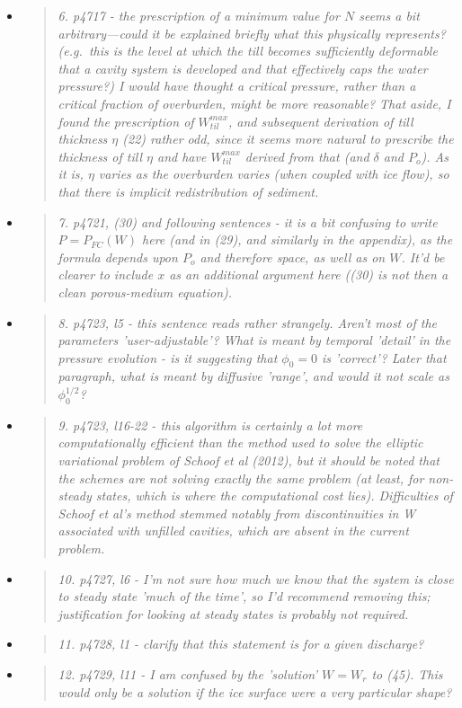 \documentclass[11pt,reqno]{amsart}
\newcommand{\reply}[2]{
\medskip\medskip
\item  \begin{quote}
\emph{#1}
\end{quote}

\medskip
\noindent #2}
\begin{document}
\begin{itemize}
\reply{6. p4717 - the prescription of a minimum value for $N$ seems a bit arbitrary---could
it be explained briefly what this physically represents? (e.g.~this is the level at which the till becomes sufficiently deformable that a cavity system is developed and that effectively caps the water pressure?) I would have thought a critical pressure, rather than a critical fraction of overburden, might be more reasonable? That aside, I found the prescription of $W_{til}^{max}$, and subsequent derivation of till thickness $\eta$ (22) rather odd, since it seems more natural to prescribe the thickness of till $\eta$ and have $W_{til}^{max}$ derived from that (and $\delta$ and $P_o$).  As it is, $\eta$ varies as the overburden varies (when coupled with ice flow), so that there is implicit redistribution of sediment.}
{}

\reply{7. p4721, (30) and following sentences - it is a bit confusing to write $P = P_{FC}(W)$
here (and in (29), and similarly in the appendix), as the formula depends upon $P_o$
and therefore space, as well as on $W$. It’d be clearer to include $x$ as an additional
argument here ((30) is not then a clean porous-medium equation).}
{}

\reply{8. p4723, l5 - this sentence reads rather strangely.  Aren't most of the parameters 'user-adjustable'?  What is meant by temporal 'detail' in the pressure evolution - is it suggesting that $\phi_0=0$ is 'correct'?  Later that paragraph, what is meant by diffusive 'range', and would it not scale as $\phi_0^{1/2}$?}
{}

\reply{9. p4723, l16-22 - this algorithm is certainly a lot more computationally efficient
than the method used to solve the elliptic variational problem of Schoof et al
(2012), but it should be noted that the schemes are not solving exactly the same
problem (at least, for non-steady states, which is where the computational cost
lies).  Difficulties of Schoof et al’s method stemmed notably from discontinuities
in W associated with unfilled cavities, which are absent in the current problem.}
{}

\reply{10. p4727, l6 - I'm not sure how much we know that the system is close to steady
state 'much of the time', so I'd recommend removing this; justification for looking
at steady states is probably not required.}
{}

\reply{11. p4728, l1 - clarify that this statement is for a given discharge?}
{}

\reply{12. p4729, l11 - I am confused by the 'solution' $W = W_r$ to (45). This would only be
a solution if the ice surface were a very particular shape?}
{}


\end{itemize}
\end{document}
